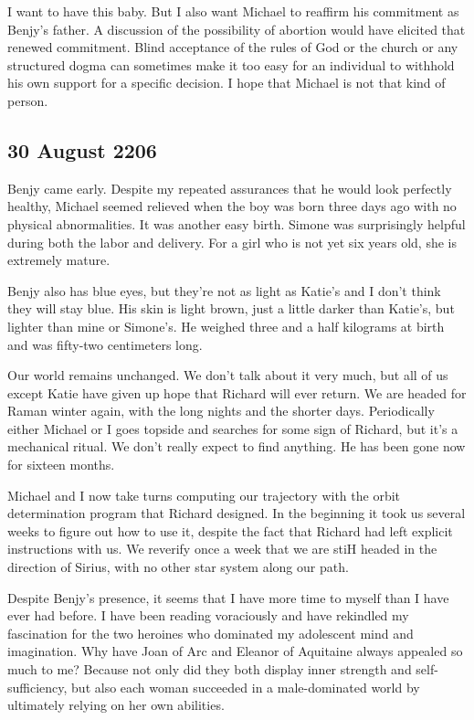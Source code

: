 \documentclass[]{article}
\begin{document}
I want to have this baby.  But I also want Michael to reaffirm his commitment as Benjy’s father.  A discussion of the possibility of abortion would have elicited that renewed commitment.  Blind acceptance of the rules of God or the church or any structured dogma can sometimes make it too easy for an individual to withhold his own support for a specific decision.  I hope that Michael is not that kind of person.

\subsection*{30 August 2206}

Benjy came early.  Despite my repeated assurances that he would look perfectly healthy, Michael seemed relieved when the boy was born three days ago with no physical abnormalities.  It was another easy birth.  Simone was surprisingly helpful during both the labor and delivery.  For a girl who is not yet six years old, she is extremely mature.

Benjy also has blue eyes, but they’re not as light as Katie’s and I don’t think they will stay blue.  His skin is light brown, just a little darker than Katie’s, but lighter than mine or Simone’s.  He weighed three and a half kilograms at birth and was fifty-two centimeters long.

Our world remains unchanged.  We don’t talk about it very much, but all of us except Katie have given up hope that Richard will ever return.  We are headed for Raman winter again, with the long nights and the shorter days.  Periodically either Michael or I goes topside and searches for some sign of Richard, but it’s a mechanical ritual.  We don’t really expect to find anything.  He has been gone now for sixteen months.

Michael and I now take turns computing our trajectory with the orbit determination program that Richard designed.  In the beginning it took us several weeks to figure out how to use it, despite the fact that Richard had left explicit instructions with us.  We reverify once a week that we are stiH headed in the direction of Sirius, with no other star system along our path.

Despite Benjy’s presence, it seems that I have more time to myself than I have ever had before.  I have been reading voraciously and have rekindled my fascination for the two heroines who dominated my adolescent mind and imagination.  Why have Joan of Arc and Eleanor of Aquitaine always appealed so much to me? Because not only did they both display inner strength and self-sufficiency, but also each woman succeeded in a male-dominated world by ultimately relying on her own abilities.
\end{document}
